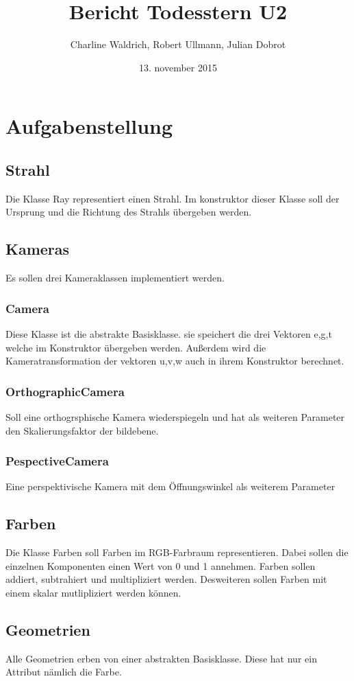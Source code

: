 \documentclass[14pt]{extarticle}
\title{Bericht Todesstern U2}
\author{Charline Waldrich, Robert Ullmann, Julian Dobrot}
\date{13. november 2015}
\begin{document}
\maketitle
\pagebreak
\tableofcontents


\section{Aufgabenstellung}

\subsection{Strahl}
Die Klasse Ray representiert einen Strahl. Im konstruktor dieser Klasse soll der Ursprung und die Richtung des Strahls übergeben werden.  
\subsection{Kameras}
Es sollen drei Kameraklassen implementiert werden. 
\subsubsection{Camera}
Diese Klasse ist die abstrakte Basisklasse. sie speichert die drei Vektoren e,g,t welche im Konstruktor übergeben werden. Außerdem 
wird die Kameratransformation der vektoren u,v,w auch in ihrem Konstruktor berechnet.
\subsubsection{OrthographicCamera}
Soll eine orthogrsphische Kamera wiederspiegeln und hat als weiteren Parameter den Skalierungsfaktor der bildebene.
\subsubsection{PespectiveCamera}
Eine perspektivische Kamera mit dem Öffnungswinkel als weiterem Parameter 

\subsection{Farben}
Die Klasse Farben soll Farben im RGB-Farbraum representieren. Dabei sollen die einzelnen Komponenten einen Wert von 0 und 1 annehmen. Farben sollen addiert, subtrahiert und multipliziert werden. Desweiteren sollen Farben mit einem skalar mutlipliziert werden können.

\subsection{Geometrien}
Alle Geometrien erben von einer abstrakten Basisklasse. Diese hat nur ein Attribut nämlich die Farbe. 
\end{document}

